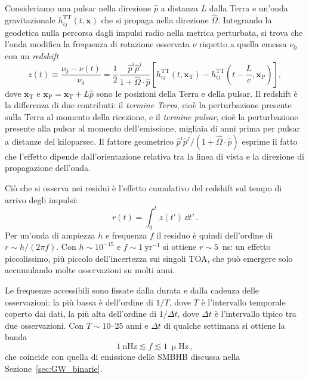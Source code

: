 Consideriamo una pulsar nella direzione $\hat{p}$ a distanza $L$ dalla Terra e un'onda gravitazionale $h_{ij}^{\mathrm{TT}}(t,\bm{x})$ che si propaga nella direzione $\hat{\Omega}$. Integrando la geodetica nulla percorsa dagli impulsi radio nella metrica perturbata, si trova che l'onda modifica la frequenza di rotazione osservata $\nu$ rispetto a quella emessa $\nu_0$ con un \textit{redshift}~\cite{Detweiler1979, Taylor2021, Maggiore2018}
\begin{equation}
    z(t) \equiv \frac{\nu_0 - \nu(t)}{\nu_0} = \frac{1}{2}\, \frac{\hat{p}^i \hat{p}^j}{1 + \hat{\Omega}\cdot\hat{p}} \left[ h_{ij}^{\mathrm{TT}}(t, \bm{x}_{\mathrm{T}}) - h_{ij}^{\mathrm{TT}}\!\left(t - \frac{L}{c}, \bm{x}_{\mathrm{P}}\right) \right] ,
    \label{eq:redshift_GW}
\end{equation}
dove $\bm{x}_{\mathrm{T}}$ e $\bm{x}_{\mathrm{P}} = \bm{x}_{\mathrm{T}} + L\hat{p}$ sono le posizioni della Terra e della pulsar. Il redshift è la differenza di due contributi: il \textit{termine Terra}, cioè la perturbazione presente sulla Terra al momento della ricezione, e il \textit{termine pulsar}, cioè la perturbazione presente alla pulsar al momento dell'emissione, migliaia di anni prima per pulsar a distanze del kiloparsec. Il fattore geometrico $\hat{p}^i\hat{p}^j/(1+\hat{\Omega}\cdot\hat{p})$ esprime il fatto che l'effetto dipende dall'orientazione relativa tra la linea di vista e la direzione di propagazione dell'onda.

Ciò che si osserva nei residui è l'effetto cumulativo del redshift sul tempo di arrivo degli impulsi:
\begin{equation}
    r(t) = \int_0^t z(t')\, \dd t' \, .
    \label{eq:residuo_GW}
\end{equation}
Per un'onda di ampiezza $h$ e frequenza $f$ il residuo è quindi dell'ordine di $r \sim h/(2\pi f)$. Con $h \sim 10^{-15}$ e $f \sim 1\ \mathrm{yr}^{-1}$ si ottiene $r \sim 5$~ns: un effetto piccolissimo, più piccolo dell'incertezza sui singoli TOA, che può emergere solo accumulando molte osservazioni su molti anni.

Le frequenze accessibili sono fissate dalla durata e dalla cadenza delle osservazioni: la più bassa è dell'ordine di $1/T$, dove $T$ è l'intervallo temporale coperto dai dati, la più alta dell'ordine di $1/\Delta t$, dove $\Delta t$ è l'intervallo tipico tra due osservazioni. Con $T \sim 10$--$25$ anni e $\Delta t$ di qualche settimana si ottiene la banda
\begin{equation}
    1\ \mathrm{nHz} \lesssim f \lesssim 1\ \upmu\mathrm{Hz}\, ,
\end{equation}
che coincide con quella di emissione delle SMBHB discussa nella Sezione~\ref{sec:GW_binarie}.

